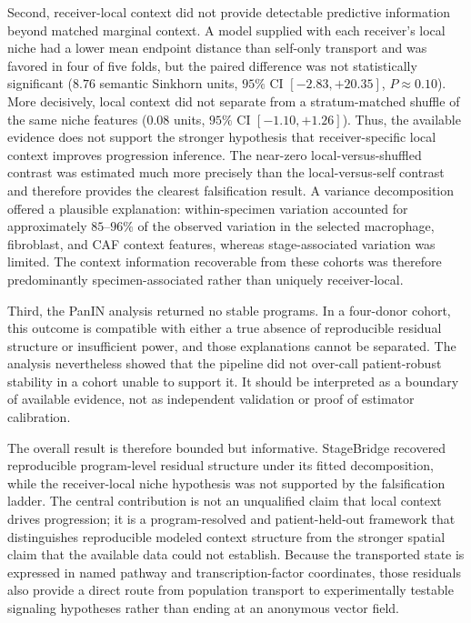 Second, receiver-local context did not provide detectable predictive information beyond matched marginal context. A model supplied with each receiver's local niche had a lower mean endpoint distance than self-only transport and was favored in four of five folds, but the paired difference was not statistically significant ($8.76$ semantic Sinkhorn units, $95\%$ CI $[-2.83,+20.35]$, $P\approx0.10$). More decisively, local context did not separate from a stratum-matched shuffle of the same niche features ($0.08$ units, $95\%$ CI $[-1.10,+1.26]$). Thus, the available evidence does not support the stronger hypothesis that receiver-specific local context improves progression inference. The near-zero local-versus-shuffled contrast was estimated much more precisely than the local-versus-self contrast and therefore provides the clearest falsification result. A variance decomposition offered a plausible explanation: within-specimen variation accounted for approximately $85$--$96\%$ of the observed variation in the selected macrophage, fibroblast, and CAF context features, whereas stage-associated variation was limited. The context information recoverable from these cohorts was therefore predominantly specimen-associated rather than uniquely receiver-local.

Third, the PanIN analysis returned no stable programs. In a four-donor cohort, this outcome is compatible with either a true absence of reproducible residual structure or insufficient power, and those explanations cannot be separated. The analysis nevertheless showed that the pipeline did not over-call patient-robust stability in a cohort unable to support it. It should be interpreted as a boundary of available evidence, not as independent validation or proof of estimator calibration.

The overall result is therefore bounded but informative. StageBridge recovered reproducible program-level residual structure under its fitted decomposition, while the receiver-local niche hypothesis was not supported by the falsification ladder. The central contribution is not an unqualified claim that local context drives progression; it is a program-resolved and patient-held-out framework that distinguishes reproducible modeled context structure from the stronger spatial claim that the available data could not establish. Because the transported state is expressed in named pathway and transcription-factor coordinates, those residuals also provide a direct route from population transport to experimentally testable signaling hypotheses rather than ending at an anonymous vector field.

